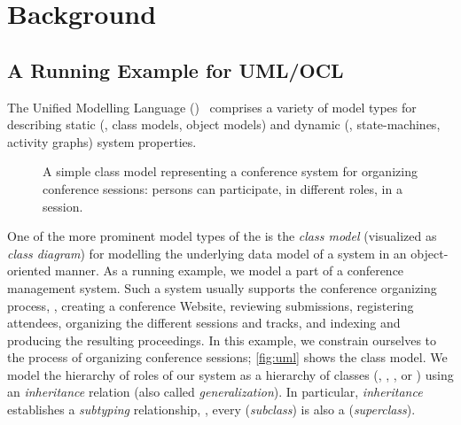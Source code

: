 
\section{Background}
\isatagafp
\subsection{A Running Example for UML/OCL}\label{sec:guidedtour}
The Unified Modelling Language
(\UML)~\cite{omg:uml-infrastructure:2011,omg:uml-superstructure:2011}
comprises a variety of model types for describing static (\eg, class
models, object models) and dynamic (\eg, state-machines, activity
graphs) system properties.
\begin{figure}
  \centering{}%
  \caption{A simple \UML class model representing a conference
    system for organizing conference sessions: persons can
    participate, in different roles, in a session. \label{fig:uml}}
\end{figure}
One of the more prominent model types of the \UML is the
\emph{class model} (visualized as \emph{class diagram}) for modelling
the underlying data model of a system in an object-oriented manner. As
a running example, we model a part of a conference management
system. Such a system usually supports the conference organizing
process, \eg, creating a conference Website, reviewing submissions,
registering attendees, organizing the different sessions and tracks,
and indexing and producing the resulting proceedings. In this example,
we constrain ourselves to the process of organizing conference
sessions; \autoref{fig:uml} shows the class model.  We model the
hierarchy of roles of our system as a hierarchy of classes (\eg,
, , or ) using
an \emph{inheritance} relation (also called \emph{generalization}). In
particular, \emph{inheritance} establishes a \emph{subtyping}
relationship, \ie, every  (\emph{subclass}) is also
a  (\emph{superclass}).

